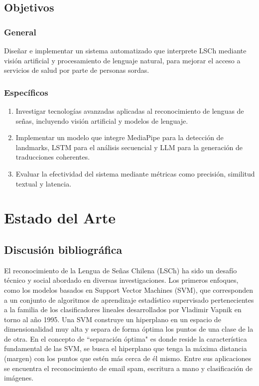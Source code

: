 \documentclass[10pt]{article}
\begin{document}
\vspace{1\baselineskip}
\subsection{Objetivos}

\subsubsection{General}

Diseñar e implementar un sistema automatizado que interprete LSCh mediante visión artificial y procesamiento de lenguaje natural, para mejorar el acceso a servicios de salud por parte de personas sordas.

\subsubsection{Específicos}

\begin{enumerate}
	\item Investigar tecnologías avanzadas aplicadas al reconocimiento de lenguas de señas, incluyendo visión artificial y modelos de lenguaje.

	\item Implementar un modelo que integre MediaPipe para la detección de landmarks, LSTM para el análisis secuencial y LLM para la generación de traducciones coherentes.

	\item Evaluar la efectividad del sistema mediante métricas como precisión, similitud textual y latencia.

\end{enumerate}
\vspace{1\baselineskip}
\section{Estado del Arte}

\subsection{Discusión bibliográfica}

El reconocimiento de la Lengua de Señas Chilena (LSCh) ha sido un desafío técnico y social abordado en diversas investigaciones. Los primeros enfoques, como los modelos basados en Support Vector Machines (SVM), que corresponden a un conjunto de algoritmos de aprendizaje estadístico supervisado pertenecientes a la familia de los clasificadores lineales desarrollados por Vladimir Vapnik en torno al año 1995. Una SVM construye un hiperplano en un espacio de dimensionalidad muy alta y separa de forma óptima los puntos de una clase de la de otra. En el concepto de ``separación óptima" es donde reside la característica fundamental de las SVM, se busca el hiperplano que tenga la máxima distancia (margen) con los puntos que estén más cerca de él mismo. Entre sus aplicaciones se encuentra el reconocimiento de email spam, escritura a mano y clasificación de imágenes.
\end{document}
